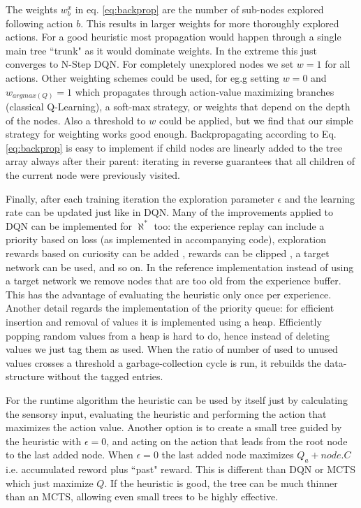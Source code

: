 \documentclass{article}
\newcommand{\alephstar}{$\aleph^*$ }
\begin{document}
The weights $w^x_b$ in eq. \ref{eq:backprop} are the number of sub-nodes explored following action $b$. This results in larger weights for more thoroughly explored actions. For a good heuristic most propagation would happen through a single main tree ``trunk" as it would dominate weights. In the extreme this just converges to N-Step DQN. For completely unexplored nodes we set $w=1$ for all actions. Other weighting schemes could be used, for eg.g setting $w=0$ and $w_{argmax(Q)}=1$ which propagates through action-value maximizing branches (classical Q-Learning), a soft-max strategy, or weights that depend on the depth of the nodes. Also a threshold to $w$ could be applied, but we find that our simple strategy for weighting works good enough. Backpropagating according to Eq. \ref{eq:backprop} is easy to implement if child nodes are linearly added to the tree array always after their parent: iterating in reverse guarantees that all children of the current node were previously visited.

Finally, after each training iteration the exploration parameter $\epsilon$ and the learning rate can be updated just like in DQN. Many of the improvements applied to DQN can be implemented for \alephstar too: the experience replay can include a priority based on loss \cite{schaul2015prioritized} (as implemented in accompanying code), exploration rewards based on curiosity can be added \cite{burda2018exploration}, rewards can be clipped \cite{pohlen2018observe}, a target network can be used, and so on. In the reference implementation instead of using a target network we remove nodes that are too old from the experience buffer. This has the advantage of evaluating the heuristic only once per experience. Another detail regards the implementation of the priority queue: for efficient insertion and removal of values it is implemented using a heap. Efficiently popping random values from a heap is hard to do, hence instead of deleting values we just tag them as used. When the ratio of number of used to unused values crosses a threshold a garbage-collection cycle is run, it rebuilds the data-structure without the tagged entries.

For the runtime algorithm the heuristic can be used by itself just by calculating the sensorsy input, evaluating the heuristic and performing the action that maximizes the action value. Another option is to create a small tree guided by the heuristic with $\epsilon=0$, and acting on the action that leads from the root node to the last added node. When $\epsilon=0$ the last added node maximizes $Q_a + \mathit{node.C}$ i.e. accumulated reword plus ``past" reward. This is different than DQN or MCTS which just maximize $Q$. If the heuristic is good, the tree can be much thinner than an MCTS, allowing even small trees to be highly effective.
\end{document}
